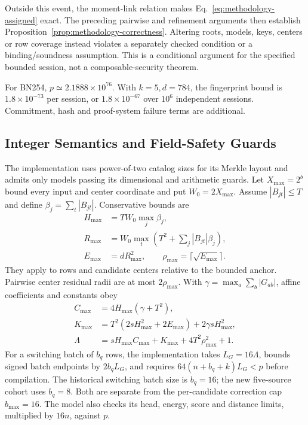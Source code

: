\documentclass[5p,times,twocolumn]{elsarticle}
\begin{document}
Outside this event, the moment-link relation makes
Eq.~\eqref{eq:methodology-assigned} exact. The preceding pairwise and
refinement arguments then establish
Proposition~\ref{prop:methodology-correctness}. Altering roots, models, keys,
centers or row coverage instead violates a separately checked condition or
a binding/soundness assumption. This is a conditional argument for the
specified bounded session, not a composable-security theorem.

For BN254, $p\simeq2.1888\times10^{76}$. With $k=5,d=784$, the
fingerprint bound is $1.8\times10^{-73}$ per session, or
$1.8\times10^{-67}$ over $10^6$ independent sessions. Commitment, hash
and proof-system failure terms are additional.

\subsection{Integer Semantics and Field-Safety Guards}
The implementation uses power-of-two catalog sizes for its Merkle layout
and admits only models passing its dimensional and arithmetic guards.
Let $X_{\max}=2^b$ bound every input and center coordinate and put
$W_0=2X_{\max}$. Assume $|B_{jt}|\leq T$ and define
$\beta_j=\sum_t|B_{jt}|$. Conservative bounds are
\begin{align}
 H_{\max}&=TW_0\max_j\beta_j,\nonumber\\
 R_{\max}&=W_0\max_t\left(T^2+\sum_j|B_{jt}|\beta_j\right),\nonumber\\
 E_{\max}&=dR_{\max}^2,\qquad
 \rho_{\max}=\lceil\sqrt{E_{\max}}\rceil.
\end{align}
They apply to rows and candidate centers relative to the bounded anchor.
Pairwise center residual radii are at most $2\rho_{\max}$. With
$\gamma=\max_a\sum_b|G_{ab}|$, affine coefficients and constants obey
\begin{align}
 C_{\max}&=4H_{\max}(\gamma+T^2),\nonumber\\
 K_{\max}&=T^2(2sH_{\max}^2+2E_{\max})
                    +2\gamma sH_{\max}^2,\nonumber\\
 \Lambda&=sH_{\max}C_{\max}+K_{\max}
                      +4T^2\rho_{\max}^2+1.
\end{align}
For a switching batch of $b_q$ rows, the implementation takes
$L_G=16\Lambda$, bounds signed batch endpoints by $2b_qL_G$, and requires
$64(n+b_q+k)L_G<p$ before compilation. The historical switching batch size is $b_q=16$; the new five-source
cohort uses $b_q=8$. Both are separate from the per-candidate correction
cap $b_{\max}=16$. The model also checks its head, energy, score and distance
limits, multiplied by $16n$, against $p$.
\end{document}
